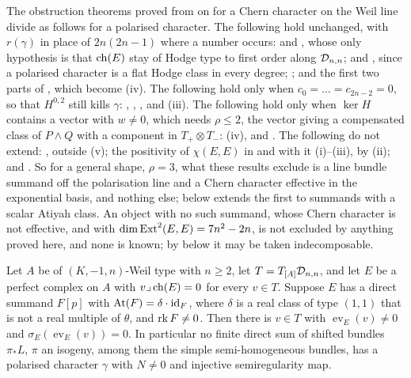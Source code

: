 \begin{remark}
\label{rem:p2primesurvive}
The obstruction theorems proved from \cite[Section~9]{paperI} on for a Chern
character on the Weil line divide as follows for a polarised character. The
following hold unchanged, with
$r(\gamma)$ in place of $2n(2n-1)$ where a number occurs:
\cite[Theorem~9.20]{paperI} and , whose only hypothesis is that
$\operatorname{ch}(E)$ stay of Hodge type to first order along $\mathcal{D}_{n,n}$;
 and , since a polarised character
is a flat Hodge class in every degree; ; and the
first two parts of , which become
(iv). The following hold only when
$c_{0}=\dots=c_{2n-2}=0$, so that $H^{0,2}$ still kills $\gamma$:
\cite[Theorem~9.7]{paperI}, \cite[Proposition~9.10]{paperI}, \cite[Corollary~9.18]{paperI},
\cite[Theorem~9.19]{paperI} and (iii). The following hold only
when $\ker H$ contains a vector with $w\ne0$, which needs $\rho\le2$, the
vector giving a compensated class of $P\wedge Q$ with a component in
$T_{+}\otimes T_{-}$: (iv),  and
. The following do not extend: ,
outside (v); the positivity of $\chi(E,E)$ in
\cite[Proposition~9.11]{paperI} and with it (i)--(iii), by
(ii); and \cite[Theorem~2.32]{paperIII}. So for a general shape,
$\rho=3$, what these results exclude is a line bundle summand off the
polarisation line and a Chern character effective in the exponential basis,
and nothing else;  below extends the first to
summands with a scalar Atiyah class. An object with no such summand, whose
Chern character is not effective, and with $\dim\operatorname{Ext}^{2}(E,E)=7n^{2}-2n$, is
not excluded by anything proved here, and none is known; by
 below it may be taken indecomposable.
\end{remark}

\begin{proposition}\label{prop:scalaratiyah}
Let $A$ be of $(K,-1,n)$-Weil type with $n\ge2$, let $T=T_{[A]}\mathcal{D}_{n,n}$, and
let $E$ be a perfect complex on $A$ with $v\lrcorner\operatorname{ch}(E)=0$ for every
$v\in T$. Suppose $E$ has a direct summand $F[p]$ with
$\mathrm{At}(F)=\delta\cdot\operatorname{id}_{F}$, where $\delta$ is a real class of type
$(1,1)$ that is not a real multiple of $\theta$, and $\operatorname{rk} F\ne0$. Then there is
$v\in T$ with $\operatorname{ev}_{E}(v)\ne0$ and
$\sigma_{E}(\operatorname{ev}_{E}(v))=0$. In particular no finite direct sum
of shifted bundles $\pi_{*}L$, $\pi$ an isogeny, among them the simple
semi-homogeneous bundles, has a polarised character $\gamma$ with $N\ne0$ and
injective semiregularity map.
\end{proposition}

